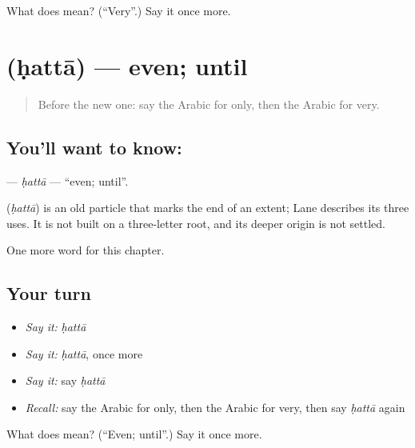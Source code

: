 \begin{tcolorbox}[breakable,colback=teal!4,colframe=teal!35!black,title={Before you move on}]
What does  mean? (\textquotedblleft{}Very\textquotedblright{}.) Say it once more.
\end{tcolorbox}
\section[\texorpdfstring{\ar{حتى} (ḥattā)}{حتى (ḥattā)}]{ (ḥattā) — even; until}

\label{lesson:AR-C207-hatta}



\begin{quote}
Before the new one: say the Arabic for only, then the Arabic for very.
\end{quote}

\subsection*{You'll want to know: }
\textbf{} — \emph{ḥattā} — \textquotedblleft{}even; until\textquotedblright{}.

\begin{cousinweb}
\textbf{} (\emph{ḥattā}) is an old particle that marks the end of an extent; Lane describes its three uses. It is not built on a three-letter root, and its deeper origin is not settled.
\end{cousinweb}

\begin{grammarlens}[title={What you've built}]
One more word for this chapter.
\end{grammarlens}

\subsection*{Your turn}
\begin{itemize}
\raggedright
  \item \emph{Say it:} \emph{ḥattā}
  \item \emph{Say it:} \emph{ḥattā}, once more
  \item \emph{Say it:} say \emph{ḥattā}
  \item \emph{Recall:} say the Arabic for only, then the Arabic for very, then say \emph{ḥattā} again
\end{itemize}

\begin{tcolorbox}[breakable,colback=teal!4,colframe=teal!35!black,title={Before you move on}]
What does  mean? (\textquotedblleft{}Even; until\textquotedblright{}.) Say it once more.
\end{tcolorbox}
